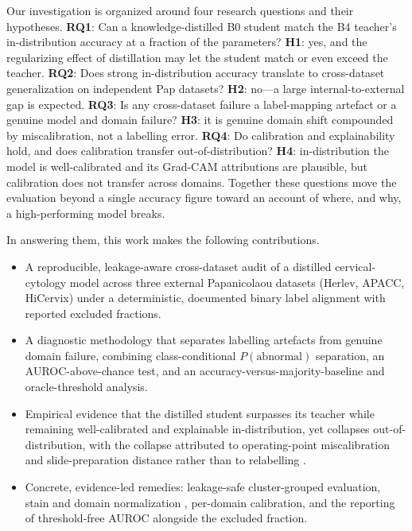 Our investigation is organized around four research questions and their hypotheses. \textbf{RQ1}: Can a knowledge-distilled B0 student match the B4 teacher's in-distribution accuracy at a fraction of the parameters? \textbf{H1}: yes, and the regularizing effect of distillation may let the student match or even exceed the teacher. \textbf{RQ2}: Does strong in-distribution accuracy translate to cross-dataset generalization on independent Pap datasets? \textbf{H2}: no---a large internal-to-external gap is expected. \textbf{RQ3}: Is any cross-dataset failure a label-mapping artefact or a genuine model and domain failure? \textbf{H3}: it is genuine domain shift compounded by miscalibration, not a labelling error. \textbf{RQ4}: Do calibration and explainability hold, and does calibration transfer out-of-distribution? \textbf{H4}: in-distribution the model is well-calibrated \citep{guo2017calibration} and its Grad-CAM attributions are plausible, but calibration does not transfer across domains. Together these questions move the evaluation beyond a single accuracy figure toward an account of where, and why, a high-performing model breaks.

In answering them, this work makes the following contributions.

\begin{itemize}
\item A reproducible, leakage-aware cross-dataset audit of a distilled cervical-cytology model across three external Papanicolaou datasets (Herlev, APACC, HiCervix) under a deterministic, documented binary label alignment with reported excluded fractions.
\item A diagnostic methodology that separates labelling artefacts from genuine domain failure, combining class-conditional $P(\text{abnormal})$ separation, an AUROC-above-chance test, and an accuracy-versus-majority-baseline and oracle-threshold analysis.
\item Empirical evidence that the distilled student surpasses its teacher while remaining well-calibrated and explainable in-distribution, yet collapses out-of-distribution, with the collapse attributed to operating-point miscalibration and slide-preparation distance rather than to relabelling \citep{geirhos2020shortcut}.
\item Concrete, evidence-led remedies: leakage-safe cluster-grouped evaluation, stain and domain normalization \citep{macenko2009stain}, per-domain calibration, and the reporting of threshold-free AUROC alongside the excluded fraction.
\end{itemize}